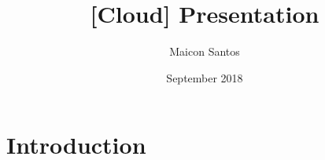 \documentclass{article}
\title{[Cloud] Presentation}
\author{Maicon Santos}
\date{September 2018}
\begin{document}
\maketitle

\section{Introduction}
\end{document}
